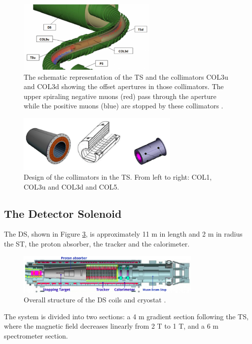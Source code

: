 \begin{figure}[!h]
    \centering
    \includegraphics[width =0.6\textwidth]{figures/png/800px-MuonBeamlineCollimators2.png}
    \caption[The Transport Solenoid and the collimators.]{The schematic representation of the TS and the collimators COL3u and 
    COL3d showing the offset apertures in those collimators. The 
    upper spiraling negative muons (red) pass through the aperture while 
    the positive muons (blue) are stopped by these collimators \cite{tsview}.}
    \label{fig:collimators}
    \end{figure}
    \begin{figure}[!h]
        \centering
        \includegraphics[width =0.7\textwidth]{figures/png/Screenshot_20240706_120535.png}
        \caption[The design of the collimators in the TS.]{Design of the collimators in the TS. From left to right: COL1, COL3u and COL3d
        and COL5.}
        \label{fig:collimatorsshape}
        \end{figure}

\subsection{The Detector Solenoid}\label{detectorsolenoid}
The DS, shown in Figure \ref{fig:DS}, is  approximately 11 m in 
length and 2 m in radius the ST, 
the proton absorber, the tracker and the calorimeter. 
\begin{figure}[!h]
    \centering
    \includegraphics[width =0.8\textwidth]{figures/png/Screenshot_20240306_225639.png}
    \caption[The structure of the Detector Solenoid coils and cryostat.]{Overall structure of the DS coils and cryostat \cite{bobbb}.}
    \label{fig:DS}
    \end{figure}
The system is divided into two sections: a 4 
m gradient section following the TS, 
where the magnetic field decreases linearly from 2 T to 1 T, and a 6 
m spectrometer section. 

